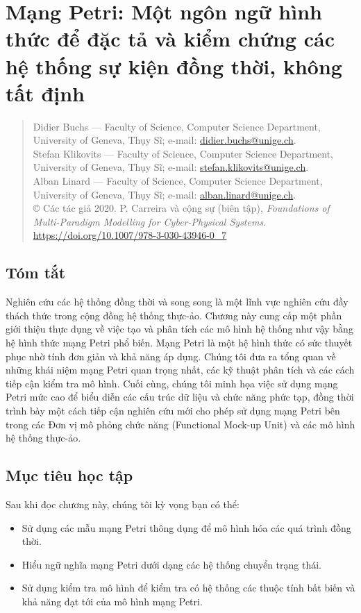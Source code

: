 \chapter{Mạng Petri: Một ngôn ngữ hình thức để đặc tả và kiểm chứng các hệ thống sự kiện đồng thời, không tất định}
\begin{quote}\small
Didier Buchs --- Faculty of Science, Computer Science Department, University of Geneva, Thụy Sĩ; e-mail: \url{didier.buchs@unige.ch}.\\
Stefan Klikovits --- Faculty of Science, Computer Science Department, University of Geneva, Thụy Sĩ; e-mail: \url{stefan.klikovits@unige.ch}.\\
Alban Linard --- Faculty of Science, Computer Science Department, University of Geneva, Thụy Sĩ; e-mail: \url{alban.linard@unige.ch}.\\
© Các tác giả 2020. P. Carreira và cộng sự (biên tập), \emph{Foundations of Multi-Paradigm Modelling for Cyber-Physical Systems}.\\
\url{https://doi.org/10.1007/978-3-030-43946-0_7}
\end{quote}

\section*{Tóm tắt}
Nghiên cứu các hệ thống đồng thời và song song là một lĩnh vực nghiên cứu đầy thách thức trong cộng đồng hệ thống thực-ảo. Chương này cung cấp một phần giới thiệu thực dụng về việc tạo và phân tích các mô hình hệ thống như vậy bằng hệ hình thức mạng Petri phổ biến. Mạng Petri là một hệ hình thức có sức thuyết phục nhờ tính đơn giản và khả năng áp dụng. Chúng tôi đưa ra tổng quan về những khái niệm mạng Petri quan trọng nhất, các kỹ thuật phân tích và các cách tiếp cận kiểm tra mô hình. Cuối cùng, chúng tôi minh họa việc sử dụng mạng Petri mức cao để biểu diễn các cấu trúc dữ liệu và chức năng phức tạp, đồng thời trình bày một cách tiếp cận nghiên cứu mới cho phép sử dụng mạng Petri bên trong các Đơn vị mô phỏng chức năng (Functional Mock-up Unit) và các mô hình hệ thống thực-ảo.

\section*{Mục tiêu học tập}
Sau khi đọc chương này, chúng tôi kỳ vọng bạn có thể:
\begin{itemize}
\item Sử dụng các mẫu mạng Petri thông dụng để mô hình hóa các quá trình đồng thời.
\item Hiểu ngữ nghĩa mạng Petri dưới dạng các hệ thống chuyển trạng thái.
\item Sử dụng kiểm tra mô hình để kiểm tra có hệ thống các thuộc tính bất biến và khả năng đạt tới của mô hình mạng Petri.
\end{itemize}

